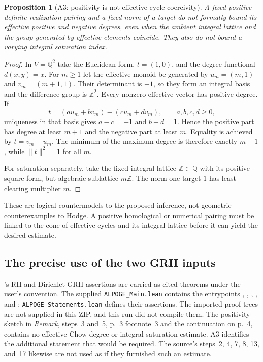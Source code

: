 \documentclass[11pt,a4paper]{article}
\newtheorem{proposition}[theorem]{Proposition}
\theoremstyle{definition}\newtheorem{definition}[theorem]{Definition}
\theoremstyle{remark}\newtheorem{remark}[theorem]{Remark}
\newcommand{\Q}{\mathbb Q}\newcommand{\Z}{\mathbb Z}\newcommand{\C}{\mathbb C}\newcommand{\R}{\mathbb R}
\begin{document}
\begin{proposition}[A3: positivity is not effective-cycle coercivity]\label{A3}
A fixed positive definite realization pairing and a fixed norm of a target do not formally bound its effective positive and negative degrees, even when the ambient integral lattice and the group generated by effective elements coincide. They also do not bound a varying integral saturation index.
\end{proposition}
\begin{proof}
In $V=\Q^2$ take the Euclidean form, $t=(1,0)$, and the degree functional $d(x,y)=x$. For $m\ge1$ let the effective monoid be generated by $u_m=(m,1)$ and $v_m=(m+1,1)$. Their determinant is $-1$, so they form an integral basis and the difference group is $\Z^2$. Every nonzero effective vector has positive degree. If
\[
 t=(a u_m+b v_m)-(c u_m+d v_m),\qquad a,b,c,d\ge0,
\]
uniqueness in that basis gives $a-c=-1$ and $b-d=1$. Hence the positive part has degree at least $m+1$ and the negative part at least $m$. Equality is achieved by $t=v_m-u_m$. The minimum of the maximum degree is therefore exactly $m+1$, while $\|t\|^2=1$ for all $m$.

For saturation separately, take the fixed integral lattice $\Z\subset\Q$ with its positive square form, but algebraic sublattice $m\Z$. The norm-one target $1$ has least clearing multiplier $m$.
\end{proof}

These are logical countermodels to the proposed inference, not geometric counterexamples to Hodge. A positive homological or numerical pairing must be linked to the cone of effective cycles and its integral lattice before it can yield the desired estimate.

\subsection*{The precise use of the two GRH inputs}
\citet{Alpoge26}'s RH and Dirichlet-GRH assertions are carried as cited theorems under the user's convention. The supplied \texttt{ALPOGE\_Main.lean} contains the entrypoints , , , , and ; \texttt{ALPOGE\_Statements.lean} defines their assertions. The imported proof trees are not supplied in this ZIP, and this run did not compile them. The positivity sketch in \emph{Remark}, steps~3 and~5, p.~3 footnote~3 and the continuation on p.~4, contains no effective Chow-degree or integral saturation estimate. A3 identifies the additional statement that would be required. The source's steps~2, 4, 7, 8, 13, and~17 likewise are not used as if they furnished such an estimate.
\end{document}
